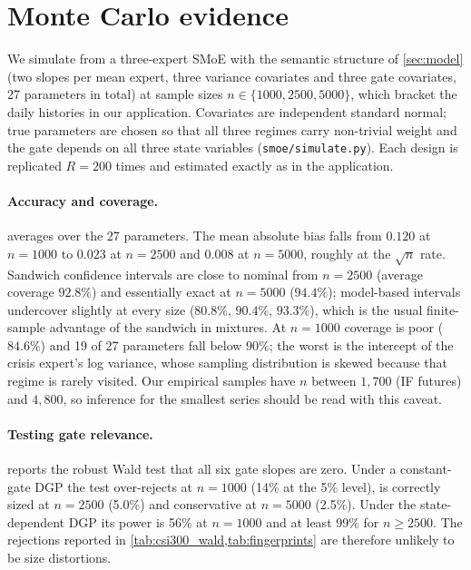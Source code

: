 \section{Monte Carlo evidence}\label{sec:montecarlo}

We simulate from a three-expert SMoE with the semantic structure of \cref{sec:model} (two slopes per
mean expert, three variance covariates and three gate covariates, 27 parameters in total) at sample
sizes $n\in\{1000,2500,5000\}$, which bracket the daily histories in our application. Covariates are
independent standard normal; true parameters are chosen so that all three regimes carry non-trivial
weight and the gate depends on all three state variables (\texttt{smoe/simulate.py}). Each design is
replicated $R=200$ times and estimated exactly as in the application.

\paragraph{Accuracy and coverage.}  averages over the 27 parameters. The mean
absolute bias falls from $0.120$ at $n=1000$ to $0.023$ at $n=2500$ and $0.008$ at $n=5000$, roughly at
the $\sqrt n$ rate. Sandwich confidence intervals are close to nominal from $n=2500$ (average
coverage $92.8\%$) and essentially exact at $n=5000$ ($94.4\%$); model-based intervals undercover
slightly at every size ($80.8\%$, $90.4\%$, $93.3\%$), which is the usual finite-sample advantage of
the sandwich in mixtures. At $n=1000$ coverage is poor ($84.6\%$) and 19 of 27 parameters fall below
$90\%$; the worst is the intercept of the crisis expert's log variance, whose sampling distribution is
skewed because that regime is rarely visited. Our empirical samples have $n$ between $1{,}700$ (IF
futures) and $4{,}800$, so inference for the smallest series should be read with this caveat.

\paragraph{Testing gate relevance.}  reports the robust Wald test that all six gate
slopes are zero. Under a constant-gate DGP the test over-rejects at $n=1000$ (14\% at the 5\% level), is
correctly sized at $n=2500$ (5.0\%) and conservative at $n=5000$ (2.5\%). Under the state-dependent
DGP its power is 56\% at $n=1000$ and at least 99\% for $n\ge2500$. The rejections reported in
\cref{tab:csi300_wald,tab:fingerprints} are therefore unlikely to be size distortions.



